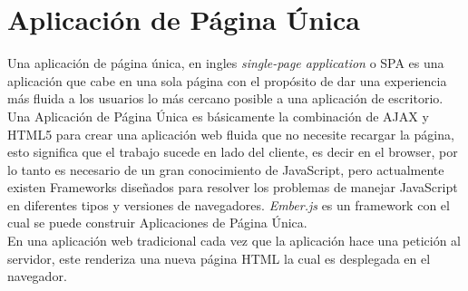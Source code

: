 
\section{Aplicación de Página Única}
\label{sec:Single Page App}

Una aplicación de página única, en ingles \emph{single-page application} o SPA es una aplicación que cabe en una sola página con el propósito de dar una experiencia más fluida a los usuarios lo más cercano posible a una aplicación de escritorio. \cite{spa_wiki}\\

Una Aplicación de Página Única es básicamente la combinación de AJAX y HTML5 para crear una aplicación web fluida que no necesite recargar la página, esto significa que el trabajo sucede en lado del cliente, es decir en el browser, por lo tanto es necesario de un gran conocimiento de JavaScript, pero actualmente existen Frameworks diseñados para resolver los problemas de manejar JavaScript en diferentes tipos y versiones de navegadores. \emph{Ember.js} es un framework con el cual se puede construir Aplicaciones de Página Única. \\





En una aplicación web tradicional cada vez que la aplicación hace una petición al servidor, este renderiza una nueva página HTML la cual es desplegada en el navegador.\\



